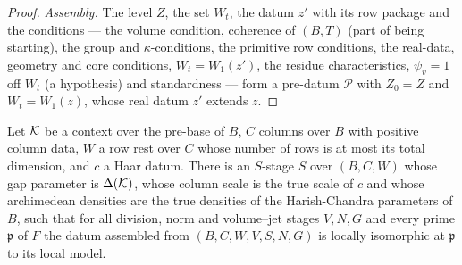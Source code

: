 \begin{proof}
\emph{Assembly.} The level $Z$, the set $W_t$, the datum $z'$ with its row package and the conditions --- the volume condition, coherence of $(B,T)$
(part of being starting), the group and $\kappa$-conditions, the primitive row conditions, the real-data, geometry and core conditions,
$W_t=W_1(z')$, the residue characteristics, $\psi_v=1$ off $W_t$ (a hypothesis) and standardness --- form a pre-datum $\mathcal P$ with $Z_0=Z$
and $W_t=W_1(z)$, whose real datum $z'$ extends $z$.
\end{proof}

\begin{lemma}\label{pf:bundles:lem:sstage}
Let $\mathcal K$ be a context over the pre-base of $B$, $C$ columns over $B$ with positive column data, $W$ a row rest over $C$ whose number of rows
is at most its total dimension, and $c$ a Haar datum. There is an $S$-stage $S$ over $(B,C,W)$ whose gap parameter is $\Delta(\mathcal K)$, whose
column scale is the true scale of $c$ and whose archimedean densities are the true densities of the Harish-Chandra parameters of $B$, such
that for all division, norm and volume--jet stages $V,N,G$ and every prime $\mathfrak p$ of $F$ the datum assembled from $(B,C,W,V,S,N,G)$ is
locally isomorphic at $\mathfrak p$ to its local model.
\end{lemma}

